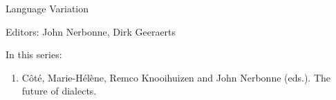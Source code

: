 {\large Language Variation}

\bigskip

Editors: John Nerbonne, Dirk Geeraerts

\bigskip

In this series:

\begin{enumerate}
\item Côté, Marie-Hélène, Remco Knooihuizen and John Nerbonne (eds.). The future of dialects.
\end{enumerate}


\vfill



